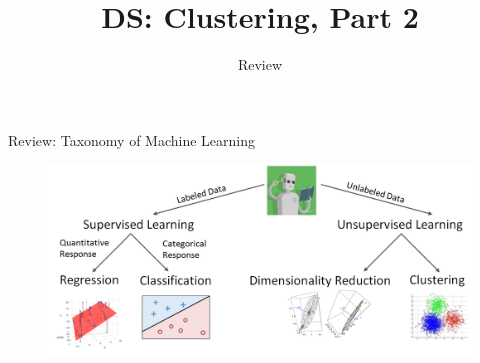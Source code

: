\documentclass[aspectratio=169]{../latex_main/tntbeamer}  %
\title[Introduction]{DS: Clustering, Part 2}
\subtitle{Review}
\begin{document}
	
	\maketitle
	\begin{frame}{Review: Taxonomy of Machine Learning}
	    \begin{figure}
	        \centering
	        \includegraphics[scale=.4]{Bild1}
	    \end{figure}
	\end{frame}
	
\end{document}
